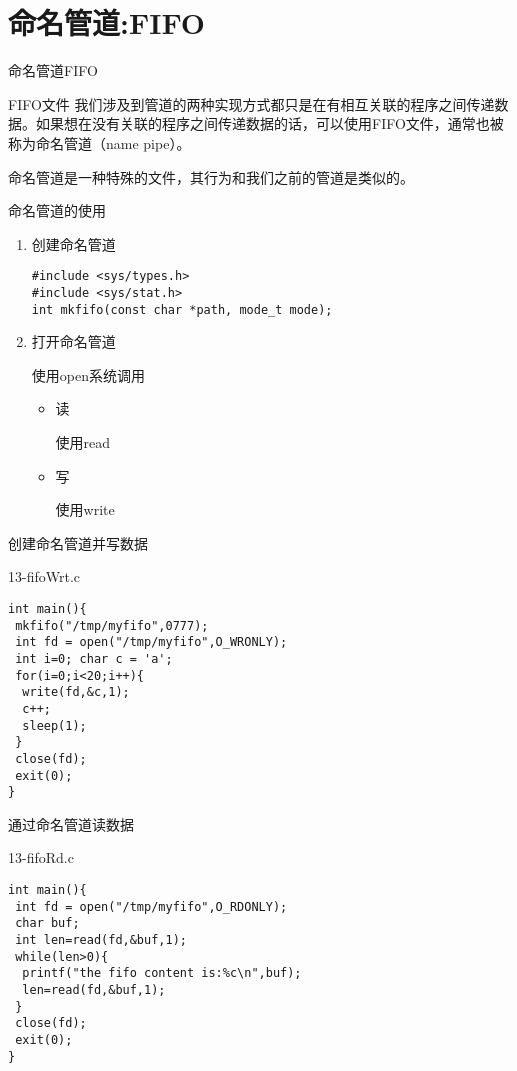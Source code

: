 \documentclass{beamer}
\begin{document}
\section{命名管道:FIFO}
\begin{frame}
\Huge{\centerline{命名管道FIFO}}
\end{frame}
\begin{frame}{FIFO文件}
我们涉及到管道的两种实现方式都只是在有相互关联的程序之间传递数据。如果想在没有关联的程序之间传递数据的话，可以使用FIFO文件，通常也被称为命名管道（name pipe）。

命名管道是一种特殊的文件，其行为和我们之前的管道是类似的。
\end{frame}
\begin{frame}[fragile]{命名管道的使用}
\begin{enumerate}
\item
创建命名管道
\begin{verbatim}
#include <sys/types.h>
#include <sys/stat.h>
int mkfifo(const char *path, mode_t mode);
\end{verbatim}
\item
打开命名管道

使用open系统调用
\begin{itemize}
\item
读

使用read
\item
写

使用write
\end{itemize}
\end{enumerate}
\end{frame}
\begin{frame}[fragile]{创建命名管道并写数据}
\begin{block}{13-fifoWrt.c}
\begin{verbatim}
int main(){
 mkfifo("/tmp/myfifo",0777);
 int fd = open("/tmp/myfifo",O_WRONLY);
 int i=0; char c = 'a';
 for(i=0;i<20;i++){
  write(fd,&c,1);
  c++;
  sleep(1);
 }
 close(fd);
 exit(0);
}
\end{verbatim}
\end{block}
\end{frame}
\begin{frame}[fragile]{通过命名管道读数据}
\begin{block}{13-fifoRd.c}
\begin{verbatim}
int main(){
 int fd = open("/tmp/myfifo",O_RDONLY);
 char buf;
 int len=read(fd,&buf,1);
 while(len>0){
  printf("the fifo content is:%c\n",buf);
  len=read(fd,&buf,1);
 }
 close(fd);
 exit(0);		
}
\end{verbatim}
\end{block}
\end{frame}
\end{document}
